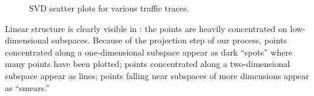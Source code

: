 \documentclass[conference]{IEEEtran}
\begin{document}
\begin{figure}[!t]
\vspace{0.5em}
\begin{center}
\caption{SVD scatter plots for various traffic traces.} 
\end{center}
\vspace{-2em}
\end{figure}

Linear structure is clearly visible in :
the points are heavily concentrated on low-dimensional subspaces.
Because of the projection step of our process, points concentrated along a one-dimensional subspace appear as dark ``spots'' where many points have been plotted;
points concentrated along a two-dimensional subspace appear as lines;
points falling near subspaces of more dimensions appear as ``smears.''
\end{document}
